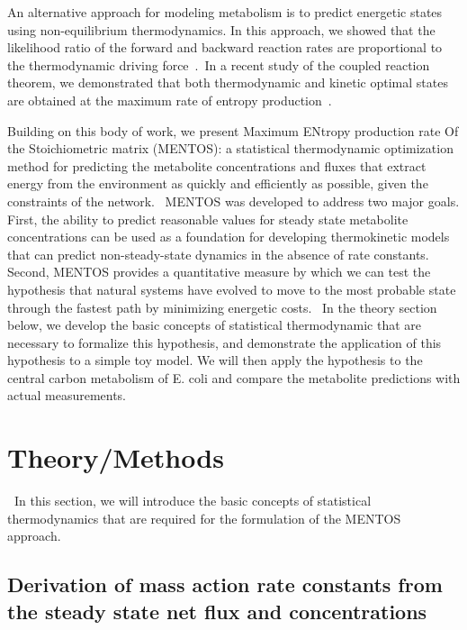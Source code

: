 \documentclass[10pt]{article}
\let\cite\citep
\providecommand\citep{\cite}
\begin{document}
An alternative approach for modeling metabolism is to predict energetic
states using non-equilibrium thermodynamics. In this approach, we showed
that the likelihood ratio of the forward and backward reaction rates are
proportional to the thermodynamic driving force~\cite{Cannon2014}.~In a
recent study of the coupled reaction theorem, we demonstrated that both
thermodynamic and kinetic optimal states are obtained at the maximum
rate of entropy production~\cite{Cannon2017}.

Building on this body of work, we present Maximum ENtropy production
rate Of the Stoichiometric matrix (MENTOS): a statistical thermodynamic
optimization method for predicting the metabolite concentrations and
fluxes that extract energy from the environment as quickly and
efficiently as possible, given the constraints of the network.~ MENTOS
was developed to address two major goals. First, the ability to predict
reasonable values for steady state metabolite concentrations can be used
as a foundation for developing thermokinetic models that can predict
non-steady-state dynamics in the absence of rate constants. Second,
MENTOS provides a quantitative measure by which we can test the
hypothesis that natural systems have evolved to move to the most
probable state through the fastest path by minimizing energetic costs.
~In the theory section below, we develop the basic concepts of
statistical thermodynamic that are necessary to formalize this
hypothesis, and demonstrate the application of this hypothesis to a
simple toy model. We will then apply the hypothesis to the central
carbon metabolism of E. coli and compare the metabolite predictions with
actual measurements.

\section{Theory/Methods}

\textbf{~}In this section, we will introduce the basic concepts of
statistical thermodynamics that are required for the formulation of the
MENTOS approach.~

\subsection{}

{\label{987965}}

\subsection{Derivation of mass action rate constants   from the steady state net flux and concentrations}          
\end{document}
